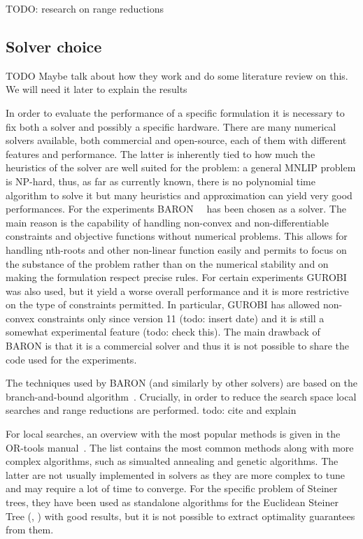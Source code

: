 \documentclass[12pt,a4paper]{article}
\numberwithin{equation}{section}
\theoremstyle{mytheorem}
\theoremstyle{myremark}
\theoremstyle{myparagraph}
\begin{document}
    TODO: research on range reductions
    
    


    \subsection{Solver choice}

    TODO Maybe talk about how they work and do some literature review on this. We will need it later to explain the results

    In order to evaluate the performance of a specific formulation it is necessary to fix both a solver and possibly a specific hardware.
    There are many numerical solvers available, both commercial and open-source, each of them with different features and performance. The latter is
    inherently tied to how much the heuristics of the solver are well suited for the problem: a general MNLIP problem is NP-hard, thus, as far as currently
    known, there is no polynomial time algorithm to solve it but many heuristics and approximation can yield very good performances.
    For the experiments BARON~\cite[TODO: ]{khajavirad2018hybrid}~\cite[TODO]{sahinidis1996baron} has been chosen as a solver. The main reason is the capability of handling
    non-convex and non-differentiable constraints and objective functions without numerical problems. This allows for handling nth-roots and
    other non-linear function easily and permits to focus on the substance of the problem rather than on the numerical stability and
    on making the formulation respect precise rules.
    For certain experiments GUROBI~\cite[TODO: ]{gurobi} was also used, but it yield a worse overall performance and it is more restrictive
    on the type of constraints permitted. In particular, GUROBI has allowed non-convex constraints only since version 11 (todo: insert date) and
    it is still a somewhat experimental feature (todo: check this).
    The main drawback of BARON is that it is a commercial solver and thus it is not possible to share the code used for the experiments.

    The techniques used by BARON (and similarly by other solvers) are based on the branch-and-bound algorithm~\cite{conforti2014integer}.
    Crucially, in order to reduce the search space local searches and range reductions are performed. todo: cite and explain

    For local searches, an overview with the most popular methods is given in the OR-tools manual~\cite{or-tools-user-manual}. The list
    contains the most common methods along with more complex algorithms, such as simualted annealing and genetic algorithms. The latter are
    not usually implemented in solvers as they are more complex to tune and may require a lot of time to converge. For the specific problem of
    Steiner trees, they have been used as standalone algorithms for the Euclidean Steiner Tree (\cite{grimwood1994euclidean}, \cite{kapsalis1993solving}) with good results, but
    it is not possible to extract optimality guarantees from them. 
\end{document}
